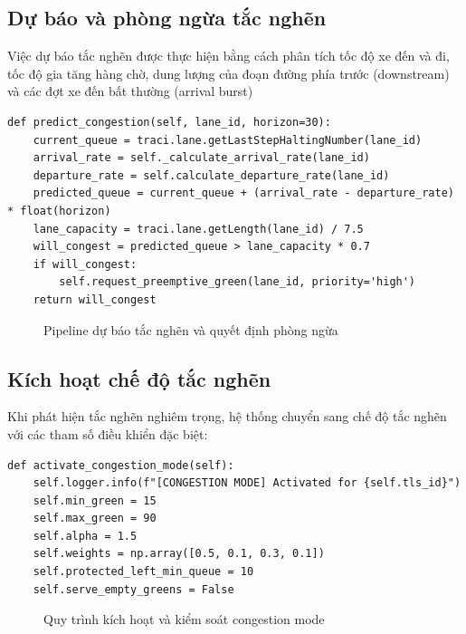 \subsection{Dự báo và phòng ngừa tắc nghẽn}
Việc dự báo tắc nghẽn được thực hiện bằng cách phân tích tốc độ xe đến và đi, tốc độ gia tăng hàng chờ, dung lượng của đoạn đường phía trước (downstream) và các đợt xe đến bất thường (arrival burst)
\begin{lstlisting}[style=py,caption={Hàm predict\_congestion}]
def predict_congestion(self, lane_id, horizon=30):
    current_queue = traci.lane.getLastStepHaltingNumber(lane_id)
    arrival_rate = self._calculate_arrival_rate(lane_id)
    departure_rate = self.calculate_departure_rate(lane_id)
    predicted_queue = current_queue + (arrival_rate - departure_rate) * float(horizon)
    lane_capacity = traci.lane.getLength(lane_id) / 7.5
    will_congest = predicted_queue > lane_capacity * 0.7
    if will_congest:
        self.request_preemptive_green(lane_id, priority='high')
    return will_congest
\end{lstlisting}

\begin{figure}[H]
    \centering
    \caption{Pipeline dự báo tắc nghẽn và quyết định phòng ngừa}
    \label{fig:congestion_forecast_diagram}
\end{figure}

\subsection{Kích hoạt chế độ tắc nghẽn}

Khi phát hiện tắc nghẽn nghiêm trọng, hệ thống chuyển sang chế độ tắc nghẽn với các tham số điều khiển đặc biệt:

\begin{lstlisting}[style=py,caption={Hàm activate\_congestion\_mode}]
def activate_congestion_mode(self):
    self.logger.info(f"[CONGESTION MODE] Activated for {self.tls_id}")
    self.min_green = 15
    self.max_green = 90
    self.alpha = 1.5
    self.weights = np.array([0.5, 0.1, 0.3, 0.1])
    self.protected_left_min_queue = 10
    self.serve_empty_greens = False
\end{lstlisting}

\begin{figure}[H]
    \centering
    \caption{Quy trình kích hoạt và kiểm soát congestion mode}
    \label{fig:congestion_mode_diagram}
\end{figure}

